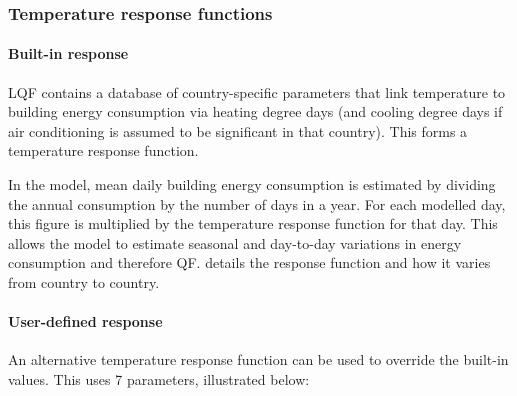 \documentclass[letterpaper,10pt,english]{sphinxmanual}
\begin{document}
\subsubsection{Temperature response functions}
\label{\detokenize{OtherManuals/LQF_Manual:temperature-response-functions}}

\paragraph{Built-in response}
\label{\detokenize{OtherManuals/LQF_Manual:built-in-response}}
LQF contains a database of country-specific parameters that link
temperature to building energy consumption via heating degree days (and
cooling degree days if air conditioning is assumed to be significant in
that country). This forms a temperature response function.

In the model, mean daily building energy consumption is estimated by
dividing the annual consumption by the number of days in a year. For
each modelled day, this figure is multiplied by the temperature response
function for that day. This allows the model to estimate seasonal and
day-to-day variations in energy consumption and therefore QF. 
details the response function and how it varies from country to country.


\paragraph{User-defined response}
\label{\detokenize{OtherManuals/LQF_Manual:user-defined-response}}
An alternative temperature response function can be used to override the
built-in values. This uses 7 parameters, illustrated below:
\end{document}

